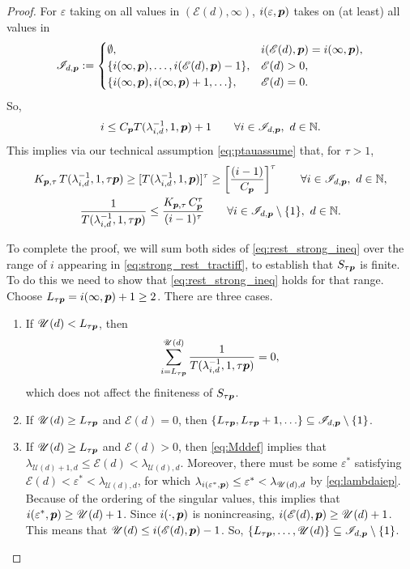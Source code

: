 \documentclass[sort&compress]{elsarticle}
\newcommand{\theM}{\mathscr{E}}
\newcommand{\theUB}{\mathscr{U}}
\begin{document}
\begin{proof}
For $\varepsilon$ taking on all values in $(\theM(d),\infty)$, $i(\varepsilon,\boldsymbol{p})$ takes on (at least) all values in
\[
\mathscr{I}_{d,\vp}:=\begin{cases}
\emptyset, & i(\theM(d),\vp) = i(\infty,\vp), \\
\{i(\infty,\vp),\ldots, i(\theM(d),\vp)-1\}, & \theM(d) > 0, \\
\{i(\infty,\vp), i(\infty,\vp) + 1, \ldots\}, & \theM(d) = 0.
\end{cases}
\]
So,
\[
i\le  C_{\boldsymbol{p}} T(\lambda_{i,d}^{-1},1,\boldsymbol{p})+1 \qquad \forall i\in \mathscr{I}_{d,\boldsymbol{p}},  \ d \in \mathbb{N}.
\]
This implies via our technical assumption \eqref{eq:ptauassume} that, for $\tau>1$,
\begin{gather}
\nonumber
 K_{\boldsymbol{p},\tau}\,T (\lambda_{i,d}^{-1},1,\tau \boldsymbol{p}) \ge
 [T(\lambda_{i,d}^{-1},1, \boldsymbol{p})]^\tau
 \ge
  \left[\frac{(i-1)}{C_{\boldsymbol{p}}}\right]^\tau \qquad \forall i\in \mathscr{I}_{d,\boldsymbol{p}},  \ d \in \mathbb{N}, \\
  \label{eq:rest_strong_ineq}
 \frac{1}{T (\lambda_{i,d}^{-1},1,\tau \boldsymbol{p})} \le
\frac{K_{\boldsymbol{p},\tau}\, C_{\boldsymbol{p}}^\tau}{(i-1)^\tau}\qquad \forall i \in \mathscr{I}_{d,\boldsymbol{p}} \setminus\{1\}, \ d \in \mathbb{N} .
\end{gather}


To complete the proof, we will sum both sides of \eqref{eq:rest_strong_ineq} over the range of $i$ appearing in \eqref{eq:strong_rest_tractiff}, to establish that $S_{\tau\boldsymbol{p}}$ is finite.  To do this we need to show that \eqref{eq:rest_strong_ineq} holds for that range.  Choose $L_{\tau\boldsymbol{p}} = i(\infty,\boldsymbol{p}) +1 \ge 2$. There are three cases.
\begin{enumerate}
\renewcommand{\labelenumi}{\roman{enumi})}


\item If $\theUB(d) < L_{\tau\vp}$, then
\[
\sum_{i = L_{\tau\vp}}^{\theUB(d)} \frac{1}{T (\lambda_{i,d}^{-1},1, \tau \vp)} = 0,
\]
which does not affect the finiteness of $S_{\tau\boldsymbol{p}}$.

\item If $\theUB(d) \ge L_{\tau\vp}$ and $\theM(d) = 0$, then $\{L_{\tau\boldsymbol{p}},  L_{\tau\boldsymbol{p}} + 1, \ldots \} \subseteq \mathscr{I}_{d,\boldsymbol{p}} \setminus \{1\}$.

\item If $\theUB(d) \ge L_{\tau\vp}$ and $\theM(d) >0$, then \eqref{eq:Mddef} implies that $\lambda_{\theUB(d)+1,d} \le \theM(d) < \lambda_{\theUB(d),d}$.  Moreover, there must be some $\varepsilon^*$ satisfying $\theM(d) < \varepsilon^* < \lambda_{\theUB(d),d}$, for which $\lambda_{i(\varepsilon^*,\vp)} \le \varepsilon^* < \lambda_{\theUB(d),d}$ by \eqref{eq:lambdaiep}.  Because of the ordering of the singular values, this implies that  $i(\varepsilon^*,\vp) \ge \theUB(d)+1$.  Since $i(\cdot,\boldsymbol{p})$ is nonincreasing, $i(\theM(d),\vp) \ge \theUB(d)+1$.
This means that $\theUB(d) \le i(\theM(d),\vp)-1$.  So, $\{L_{\tau\vp}, \ldots, \theUB(d)\} \subseteq \mathscr{I}_{d,\vp} \setminus \{1\}$.


\end{enumerate}
\end{proof}
\end{document}
